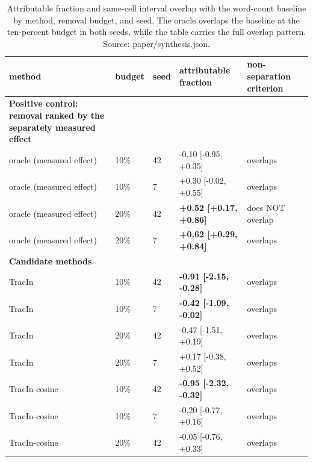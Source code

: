 \documentclass[10pt]{article}
\begin{document}
\begin{table}[tbp]
\centering
\footnotesize
\caption{ Attributable fraction and same-cell interval overlap with the word-count baseline by method, removal budget, and seed. The oracle overlaps the baseline at the ten-percent budget in both seeds, while the table carries the full overlap pattern. Source: paper/synthesis.json. }
\label{tab:af_overlap}



\begin{tabular}{ p{7.20cm}llll }
\toprule
method & budget & seed & attributable fraction & non-separation criterion \\
\midrule

\textbf{ Positive control: removal ranked by the separately measured effect } &  &  &  &  \\

oracle (measured effect) & 10\% & 42 & -0.10 [-0.95, +0.35] & overlaps \\

oracle (measured effect) & 10\% & 7 & +0.30 [-0.02, +0.55] & overlaps \\

oracle (measured effect) & 20\% & 42 & \textbf{ +0.52 [+0.17, +0.86] } & does NOT overlap \\

oracle (measured effect) & 20\% & 7 & \textbf{ +0.62 [+0.29, +0.84] } & overlaps \\

\textbf{ Candidate methods } &  &  &  &  \\

TracIn & 10\% & 42 & \textbf{ -0.91 [-2.15, -0.28] } & overlaps \\

TracIn & 10\% & 7 & \textbf{ -0.42 [-1.09, -0.02] } & overlaps \\

TracIn & 20\% & 42 & -0.47 [-1.51, +0.19] & overlaps \\

TracIn & 20\% & 7 & +0.17 [-0.38, +0.52] & overlaps \\

TracIn-cosine & 10\% & 42 & \textbf{ -0.95 [-2.32, -0.32] } & overlaps \\

TracIn-cosine & 10\% & 7 & -0.20 [-0.77, +0.16] & overlaps \\

TracIn-cosine & 20\% & 42 & -0.05 [-0.76, +0.33] & overlaps \\


\end{tabular}
\end{table}
\end{document}
